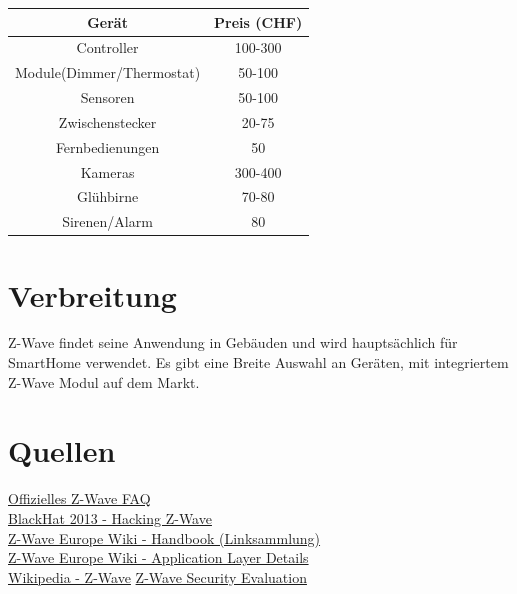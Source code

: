 \documentclass[a4paper,11pt]{article}
\begin{document}
\begin{tabular}{| c | c |}
	\hline
	\textbf{Gerät} & Preis (CHF) \\\hline
	Controller & 100-300 \\\hline
	Module(Dimmer/Thermostat) & 50-100 \\\hline
	Sensoren & 50-100 \\\hline
	Zwischenstecker & 20-75 \\\hline
	Fernbedienungen & 50 \\\hline
	Kameras & 300-400 \\\hline
	Glühbirne & 70-80 \\\hline
	Sirenen/Alarm & 80 \\\hline
	
\end{tabular}

\section*{Verbreitung}
Z-Wave findet seine Anwendung in Gebäuden und wird hauptsächlich für SmartHome verwendet. Es gibt eine Breite Auswahl an Geräten, mit integriertem Z-Wave Modul auf dem Markt.

\section*{Quellen}

\href{http://www.z-wave.com/faq}{Offizielles Z-Wave FAQ}\\
\href{https://www.youtube.com/watch?v=KYaEQhvodc8}{BlackHat 2013 - Hacking Z-Wave}\\
\href{http://wiki.zwaveeurope.com/index.php?title=Z-Wave_Technical_Handbook}{Z-Wave Europe Wiki - Handbook (Linksammlung)}\\
\href{http://wiki.zwaveeurope.com/index.php?title=Z-Wave_Application_Layer}{Z-Wave Europe Wiki - Application Layer Details}\\
\href{https://en.wikipedia.org/wiki/Z-Wave}{Wikipedia - Z-Wave}
\href{https://www.sensepost.com/cms/resources/conferences/2013/bh_zwave/Security\%20Evaluation\%20of\%20Z-Wave_WP.pdf}{Z-Wave Security Evaluation}
\end{document}
